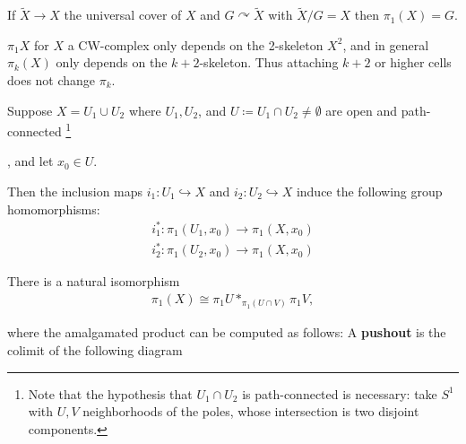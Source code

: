 \begin{proposition}

If \(\tilde X \to X\) the universal cover of \(X\) and
\(G\curvearrowright\tilde X\) with \(\tilde X/G = X\) then
\(\pi_1(X) = G\).

\end{proposition}

\begin{proposition}

\(\pi_1 X\) for \(X\) a CW-complex only depends on the 2-skeleton
\(X^{2}\), and in general \(\pi_k(X)\) only depends on the
\(k+2\)-skeleton. Thus attaching \(k+2\) or higher cells does not change
\(\pi_k\).

\end{proposition}

\begin{theorem}

Suppose \(X = U_{1} \cup U_{2}\) where \(U_1, U_2\), and
\(U \coloneqq U_{1} \cap U_{2} \neq \emptyset\) are open and
path-connected \footnote{Note that the hypothesis that \(U_1 \cap U_2\)
  is path-connected is necessary: take \(S^1\) with \(U,V\)
  neighborhoods of the poles, whose intersection is two disjoint
  components.}

, and let \(x_0 \in U\).

Then the inclusion maps \(i_{1}: U_{1} \hookrightarrow X\) and
\(i_{2}: U_{2} \hookrightarrow X\) induce the following group
homomorphisms:
\begin{align*}
i_{1}^*: \pi_{1}(U_{1}, x_0) \to\pi_{1}(X, x_0) \\
i_{2}^*: \pi_{1}(U_{2}, x_0) \to\pi_{1}(X, x_0)
\end{align*}

There is a natural isomorphism
\begin{align*}
\pi_{1}(X) \cong \pi_{1} U \ast_{\pi_{1}(U \cap V)} \pi_{1} V
,\end{align*}

where the amalgamated product can be computed as follows: A
\textbf{pushout} is the colimit of the following diagram

\begin{center}
\end{center}


\end{theorem}
